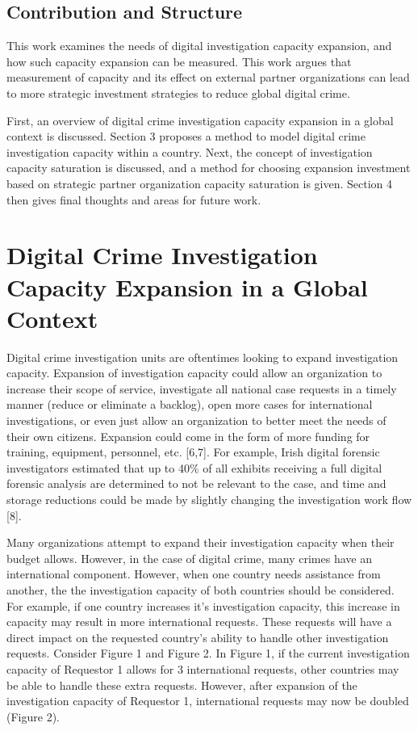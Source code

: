 \documentclass[10pt,a4paper]{article}
\begin{document}
\subsection{Contribution and Structure}
This work examines the needs of digital investigation capacity expansion, and how such capacity expansion can be measured. This work argues that measurement of capacity and its effect on external partner organizations can lead to more strategic investment strategies to reduce global digital crime.

First, an overview of digital crime investigation capacity expansion in a global context is discussed. Section 3 proposes a method to model digital crime investigation capacity within a country. Next, the concept of investigation capacity saturation is discussed, and a method for choosing expansion investment based on strategic partner organization capacity saturation is given. Section 4 then gives final thoughts and areas for future work.

\section{Digital Crime Investigation Capacity Expansion in a Global Context}
Digital crime investigation units are oftentimes looking to expand investigation capacity. Expansion of investigation capacity could allow an organization to increase their scope of service, investigate all national case requests in a timely manner (reduce or eliminate a backlog), open more cases for international investigations, or even just allow an organization to better meet the needs of their own citizens. Expansion could come in the form of more funding for training, equipment, personnel, etc. [6,7]. For example, Irish digital forensic investigators estimated that up to 40\% of all exhibits receiving a full digital forensic analysis are determined to not be relevant to the case, and time and storage reductions could be made by slightly changing the investigation work flow [8].

Many organizations attempt to expand their investigation capacity when their budget allows. However, in the case of digital crime, many crimes have an international component. However, when one country needs assistance from another, the the investigation capacity of both countries should be considered. For example, if one country increases it's investigation capacity, this increase in capacity may result in more international requests. These requests will have a direct impact on the requested country's ability to handle other investigation requests. Consider Figure 1 and Figure 2. In Figure 1, if the current investigation capacity of Requestor 1 allows for 3 international requests, other countries may be able to handle these extra requests. However, after expansion of the investigation capacity of Requestor 1, international requests may now be doubled (Figure 2).
\end{document}
